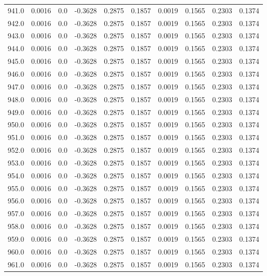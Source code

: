 \begin{longtable}{lrrrrrrrrr}
941.0 & 0.0016 & 0.0 & -0.3628 & 0.2875 & 0.1857 & 0.0019 & 0.1565 & 0.2303 & 0.1374 \\
942.0 & 0.0016 & 0.0 & -0.3628 & 0.2875 & 0.1857 & 0.0019 & 0.1565 & 0.2303 & 0.1374 \\
943.0 & 0.0016 & 0.0 & -0.3628 & 0.2875 & 0.1857 & 0.0019 & 0.1565 & 0.2303 & 0.1374 \\
944.0 & 0.0016 & 0.0 & -0.3628 & 0.2875 & 0.1857 & 0.0019 & 0.1565 & 0.2303 & 0.1374 \\
945.0 & 0.0016 & 0.0 & -0.3628 & 0.2875 & 0.1857 & 0.0019 & 0.1565 & 0.2303 & 0.1374 \\
946.0 & 0.0016 & 0.0 & -0.3628 & 0.2875 & 0.1857 & 0.0019 & 0.1565 & 0.2303 & 0.1374 \\
947.0 & 0.0016 & 0.0 & -0.3628 & 0.2875 & 0.1857 & 0.0019 & 0.1565 & 0.2303 & 0.1374 \\
948.0 & 0.0016 & 0.0 & -0.3628 & 0.2875 & 0.1857 & 0.0019 & 0.1565 & 0.2303 & 0.1374 \\
949.0 & 0.0016 & 0.0 & -0.3628 & 0.2875 & 0.1857 & 0.0019 & 0.1565 & 0.2303 & 0.1374 \\
950.0 & 0.0016 & 0.0 & -0.3628 & 0.2875 & 0.1857 & 0.0019 & 0.1565 & 0.2303 & 0.1374 \\
951.0 & 0.0016 & 0.0 & -0.3628 & 0.2875 & 0.1857 & 0.0019 & 0.1565 & 0.2303 & 0.1374 \\
952.0 & 0.0016 & 0.0 & -0.3628 & 0.2875 & 0.1857 & 0.0019 & 0.1565 & 0.2303 & 0.1374 \\
953.0 & 0.0016 & 0.0 & -0.3628 & 0.2875 & 0.1857 & 0.0019 & 0.1565 & 0.2303 & 0.1374 \\
954.0 & 0.0016 & 0.0 & -0.3628 & 0.2875 & 0.1857 & 0.0019 & 0.1565 & 0.2303 & 0.1374 \\
955.0 & 0.0016 & 0.0 & -0.3628 & 0.2875 & 0.1857 & 0.0019 & 0.1565 & 0.2303 & 0.1374 \\
956.0 & 0.0016 & 0.0 & -0.3628 & 0.2875 & 0.1857 & 0.0019 & 0.1565 & 0.2303 & 0.1374 \\
957.0 & 0.0016 & 0.0 & -0.3628 & 0.2875 & 0.1857 & 0.0019 & 0.1565 & 0.2303 & 0.1374 \\
958.0 & 0.0016 & 0.0 & -0.3628 & 0.2875 & 0.1857 & 0.0019 & 0.1565 & 0.2303 & 0.1374 \\
959.0 & 0.0016 & 0.0 & -0.3628 & 0.2875 & 0.1857 & 0.0019 & 0.1565 & 0.2303 & 0.1374 \\
960.0 & 0.0016 & 0.0 & -0.3628 & 0.2875 & 0.1857 & 0.0019 & 0.1565 & 0.2303 & 0.1374 \\
961.0 & 0.0016 & 0.0 & -0.3628 & 0.2875 & 0.1857 & 0.0019 & 0.1565 & 0.2303 & 0.1374 \\

\end{longtable}
